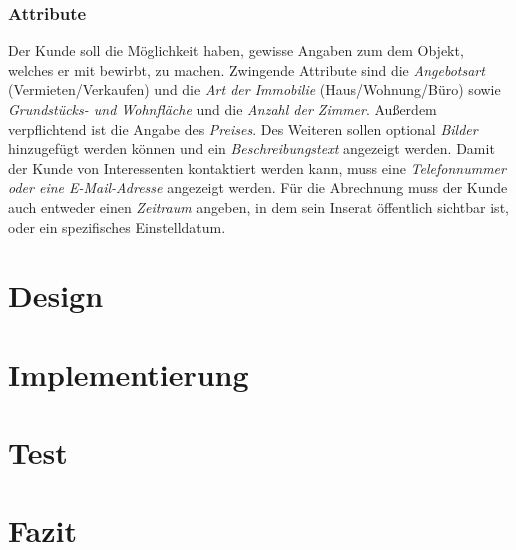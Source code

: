 \documentclass[a4paper]{scrreprt}
\begin{document}
\subsection{Attribute}
Der Kunde soll die Möglichkeit haben, gewisse Angaben zum dem Objekt, welches er mit bewirbt, zu machen. Zwingende Attribute sind die \textit{Angebotsart} (Vermieten/Verkaufen) und die \textit{Art der Immobilie} (Haus/Wohnung/Büro) sowie \textit{Grundstücks- und Wohnfläche} und die \textit{Anzahl der Zimmer}. Außerdem verpflichtend ist die Angabe des \textit{Preises}. Des Weiteren sollen optional \textit{Bilder} hinzugefügt werden können und ein \textit{Beschreibungstext} angezeigt werden.
\newline
Damit der Kunde von Interessenten kontaktiert werden kann, muss eine \textit{Telefonnummer oder eine E-Mail-Adresse} angezeigt werden.
\newline
Für die Abrechnung muss der Kunde auch entweder einen \textit{Zeitraum} angeben, in dem sein Inserat öffentlich sichtbar ist, oder ein spezifisches Einstelldatum.

\chapter{Design}

\chapter{Implementierung}

\chapter{Test}

\chapter{Fazit}
\end{document}
